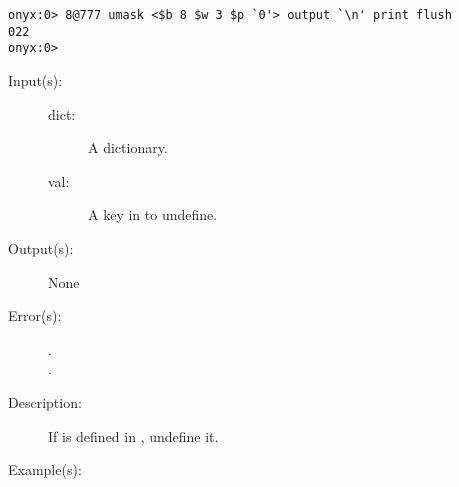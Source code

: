 \begin{description}
\begin{description}
\begin{verbatim}
onyx:0> 8@777 umask <$b 8 $w 3 $p `0'> output `\n' print flush
022
onyx:0>
		\end{verbatim}
	\end{description}
\label{systemdict:undef}
\item[{\onyxop{dict key}{undef}{--}}: ]
	\begin{description}\item[]
	\item[Input(s): ]
		\begin{description}\item[]
		\item[dict: ]
			A dictionary.
		\item[val: ]
			A key in  to undefine.
		\end{description}
	\item[Output(s): ] None
	\item[Error(s): ]
		\begin{description}\item[]
		\item[.]
		\item[.]
		\end{description}
	\item[Description: ]
		If  is defined in , undefine it.
	\item[Example(s): ]\begin{verbatim}


\end{verbatim}
\end{description}
\end{description}
